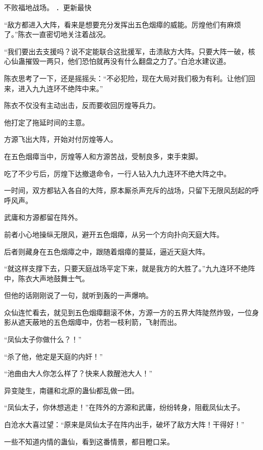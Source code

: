 
\begin{this_body}

不败福地战场。 ．更新最快

“敌方都进入大阵，看来是想要充分发挥出五色烟瘴的威能。厉煌他们有麻烦了。”陈衣一直密切地关注着战况。

“我们要出去支援吗？说不定能联合这批援军，击溃敌方大阵。只要大阵一破，核心仙蛊摧毁一两只，他们恐怕就再没有什么翻盘之力了。”白沧水建议道。

陈衣思考了一下，还是摇摇头：“不必犯险，现在大局对我们极为有利。让他们回来，进入九九连环不绝阵中来。”

陈衣不仅没有主动出击，反而要收回厉煌等兵力。

他打定了拖延时间的主意。

方源飞出大阵，开始对付厉煌等人。

在五色烟瘴当中，厉煌等人和方源苦战，受制良多，束手束脚。

吃了不少亏后，厉煌下达撤退命令，一行人钻入九九连环不绝大阵之中。

一时间，双方都钻入各自的大阵，原本厮杀声充斥的战场，只留下无限风刮起的呼呼风声。

武庸和方源都留在阵外。

前者小心地操纵无限风，避开五色烟瘴，从另一个方向扑向天庭大阵。

后者则藏身在五色烟瘴之中，跟随着烟瘴的蔓延，逼近天庭大阵。

“就这样支撑下去，只要天庭战场平定下来，就是我方的大胜了。”九九连环不绝阵中，陈衣大声地鼓舞士气。

但他的话刚刚说了一句，就听到轰的一声爆响。

众仙连忙看去，就见到五色烟瘴翻滚不休，方源一方的五界大阵陡然炸毁，一位身影从遮天蔽地的五色烟瘴中，仿若一枝利箭，飞射而出。

“凤仙太子你做什么？！”

“杀了他，他定是天庭的内奸！”

“池曲由大人你怎么样了？快来人救醒池大人！”

异变陡生，南疆和北原的蛊仙都乱做一团。

“凤仙太子，你休想逃走！”在阵外的方源和武庸，纷纷转身，阻截凤仙太子。

白沧水大喜过望：“原来是凤仙太子在阵内出手，破坏了敌方大阵！干得好！”

一些不知道内情的蛊仙，看到这番情景，都目瞪口呆。


\end{this_body}
